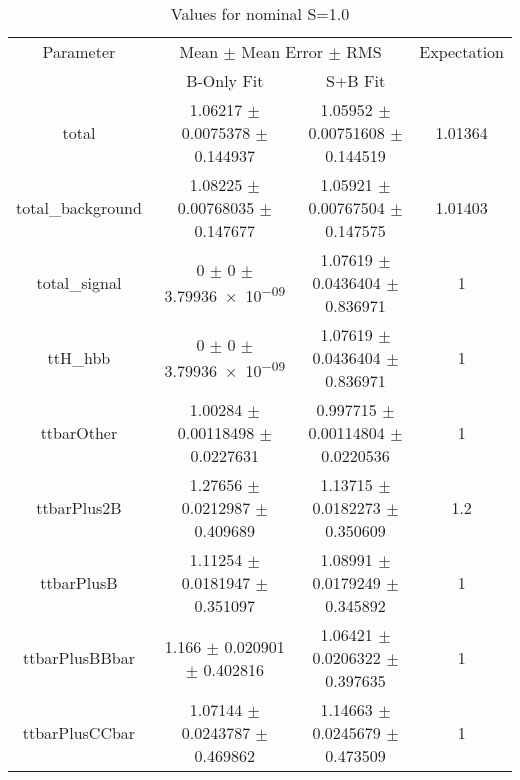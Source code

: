 \begin{table}
\centering
\caption{Values for nominal S=1.0}
\begin{tabular}{cccc}
\toprule
Parameter & \multicolumn{2}{c}{Mean $\pm$ Mean Error $\pm$ RMS} & Expectation\\
 & B-Only Fit & S+B Fit & \\
\midrule
total & \num{1.06217} $\pm$ \num{0.0075378} $\pm$ \num{0.144937} & \num{1.05952} $\pm$ \num{0.00751608} $\pm$ \num{0.144519} & \num{1.01364}\\
total\_background & \num{1.08225} $\pm$ \num{0.00768035} $\pm$ \num{0.147677} & \num{1.05921} $\pm$ \num{0.00767504} $\pm$ \num{0.147575} & \num{1.01403}\\
total\_signal & \num{0} $\pm$ \num{0} $\pm$ \num{3.79936e-09} & \num{1.07619} $\pm$ \num{0.0436404} $\pm$ \num{0.836971} & \num{1}\\
ttH\_hbb & \num{0} $\pm$ \num{0} $\pm$ \num{3.79936e-09} & \num{1.07619} $\pm$ \num{0.0436404} $\pm$ \num{0.836971} & \num{1}\\
ttbarOther & \num{1.00284} $\pm$ \num{0.00118498} $\pm$ \num{0.0227631} & \num{0.997715} $\pm$ \num{0.00114804} $\pm$ \num{0.0220536} & \num{1}\\
ttbarPlus2B & \num{1.27656} $\pm$ \num{0.0212987} $\pm$ \num{0.409689} & \num{1.13715} $\pm$ \num{0.0182273} $\pm$ \num{0.350609} & \num{1.2}\\
ttbarPlusB & \num{1.11254} $\pm$ \num{0.0181947} $\pm$ \num{0.351097} & \num{1.08991} $\pm$ \num{0.0179249} $\pm$ \num{0.345892} & \num{1}\\
ttbarPlusBBbar & \num{1.166} $\pm$ \num{0.020901} $\pm$ \num{0.402816} & \num{1.06421} $\pm$ \num{0.0206322} $\pm$ \num{0.397635} & \num{1}\\
ttbarPlusCCbar & \num{1.07144} $\pm$ \num{0.0243787} $\pm$ \num{0.469862} & \num{1.14663} $\pm$ \num{0.0245679} $\pm$ \num{0.473509} & \num{1}\\
\bottomrule
\end{tabular}
\end{table}